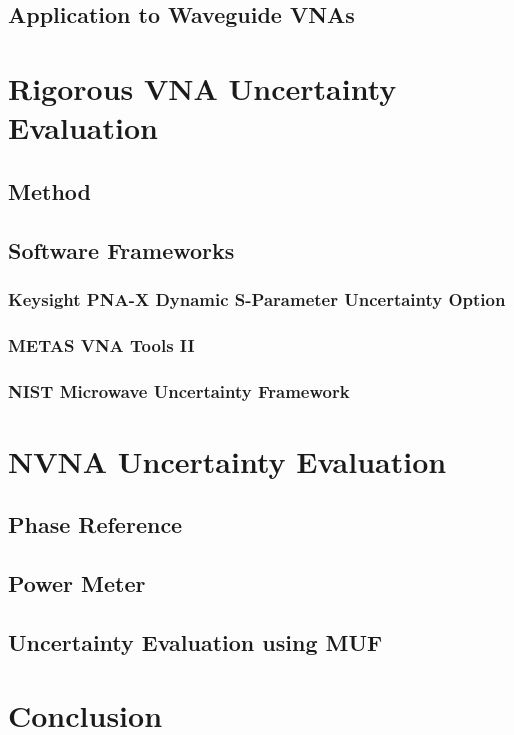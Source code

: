 \documentclass[../thesis/thesis.tex]{subfiles}
\begin{document}
\begin{refsection}
\subsection{Application to Waveguide VNAs}
\section{Rigorous VNA Uncertainty Evaluation}
\subsection{Method}
\subsection{Software Frameworks}
\subsubsection{Keysight PNA-X Dynamic S-Parameter Uncertainty Option}
\subsubsection{METAS VNA Tools II}
\subsubsection{NIST Microwave Uncertainty Framework}
\section{NVNA Uncertainty Evaluation}
\subsection{Phase Reference}
\subsection{Power Meter}
\subsection{Uncertainty Evaluation using MUF}
\section{Conclusion}
\printbibliography[title=References]
\end{refsection}
\end{document}
